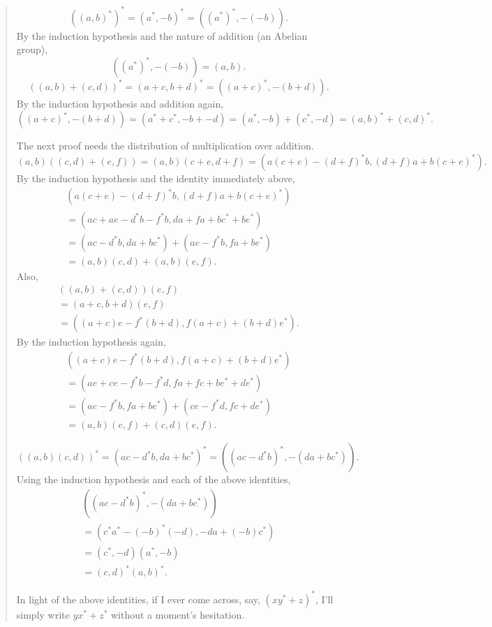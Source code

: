 \documentclass{article}
\begin{document}
\begin{quote}
\[((a, b)^*)^* = (a^*, -b)^* = ((a^*)^*, -(-b)).\] By the induction
hypothesis and the nature of addition (an Abelian group),
\[((a^*)^*, -(-b)) = (a, b).\]
\[((a, b) + (c, d))^* = (a + c, b + d)^* = ((a + c)^*, -(b + d)).\] By
the induction hypothesis and addition again,
\[((a + c)^*, -(b + d)) = (a^* + c^*, -b + -d) = (a^*, -b) + (c^*, -d) = (a, b)^* + (c, d)^*.\]

The next proof needs the distribution of multiplication over addition.
\[(a, b) ((c, d) + (e, f)) = (a, b) (c + e, d + f) = (a (c + e) - (d + f)^* b, (d + f) a + b (c + e)^*).\]
By the induction hypothesis and the identity immediately above, \[
  \begin{gathered}
    (a (c + e) - (d + f)^* b, (d + f) a + b (c + e)^*)
  \\= (a c + a e - d^* b - f^* b, d a + f a + b c^* + b e^*)
  \\= (a c - d^* b, d a + b c^*) + (a e - f^* b, f a + b e^*)
  \\= (a, b) (c, d) + (a, b) (e, f).
  \end{gathered}
\] Also, \[
  \begin{gathered}
    ((a, b) + (c, d)) (e, f)
  \\= (a + c, b + d) (e, f)
  \\= ((a + c) e - f^* (b + d), f (a + c) + (b + d) e^*).
  \end{gathered}
\] By the induction hypothesis again, \[
  \begin{gathered}
    ((a + c) e - f^* (b + d), f (a + c) + (b + d) e^*)
  \\= (a e + c e - f^* b - f^* d, f a + f c + b e^* + d e^*)
  \\= (a e - f^* b, f a + b e^*) + (c e - f^* d, f c + d e^*)
  \\= (a, b) (e, f) + (c, d) (e, f).
  \end{gathered}
\]

\[((a, b) (c, d))^* = (a c - d^* b, d a + b c^*)^* = ((a c - d^* b)^*, -(d a + b c^*)).\]
Using the induction hypothesis and each of the above identities, \[
  \begin{gathered}
    ((a c - d^* b)^*, -(d a + b c^*))
  \\= (c^* a^* - (-b)^* (-d), -d a + (-b) c^*)
  \\= (c^*, -d) (a^*, -b)
  \\= (c, d)^* (a, b)^*.
  \end{gathered}
\]

In light of the above identities, if I ever come across, say,
\((x y^* + z)^*\), I'll simply write \(y x^* + z^*\) without a moment's
hesitation.


\end{quote}
\end{document}
